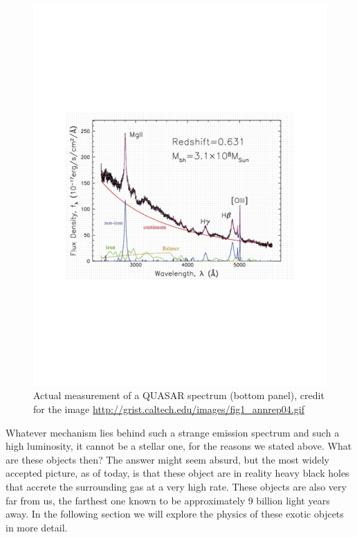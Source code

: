 \documentclass[11pt, a4paper,oneside,openright]{book}
\numberwithin{equation}{section}
\begin{document}
\begin{figure}
\begin{center}
\includegraphics[scale=0.8]{Draw/quasar_spec_real.pdf}
\end{center}
\caption{Actual measurement of a QUASAR spectrum (bottom panel), credit for the image \url{http://grist.caltech.edu/images/fig1_annrep04.gif}}
\label{quasarspecreal}
\end{figure}  

\noindent Whatever mechanism lies behind such a strange emission spectrum and such a high luminosity, it cannot be a stellar one, for the reasons we stated above. What are these objects then? The answer might seem absurd, but the most widely accepted picture, as of today, is that these object are in reality heavy black holes that accrete the surrounding gas at a very high rate. These objects are also very far from us, the farthest one known to be approximately 9 billion light years away. In the following section we will explore the physics of these exotic objcets in more detail. 
\end{document}
